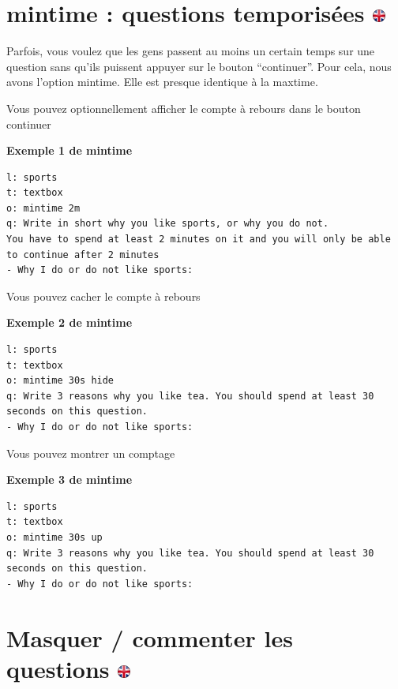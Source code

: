 \documentclass[
]{book}
\begin{document}
\hypertarget{mintime-questions-temporisuxe9es}{%
\section[mintime : questions temporisées ]{\texorpdfstring{mintime : questions temporisées \href{https://www.psytoolkit.org/doc3.4.0/online-survey-syntax.html\#mintime}{\protect\includegraphics{img/ukflag.png}}}{mintime : questions temporisées }}\label{mintime-questions-temporisuxe9es}}

Parfois, vous voulez que les gens passent au moins un certain temps sur une question sans qu'ils puissent appuyer sur le bouton ``continuer''. Pour cela, nous avons l'option mintime. Elle est presque identique à la maxtime.

Vous pouvez optionnellement afficher le compte à rebours dans le bouton continuer

\textbf{Exemple 1 de mintime}

\begin{verbatim}
l: sports
t: textbox
o: mintime 2m
q: Write in short why you like sports, or why you do not.
You have to spend at least 2 minutes on it and you will only be able to continue after 2 minutes
- Why I do or do not like sports:
\end{verbatim}

Vous pouvez cacher le compte à rebours

\textbf{Exemple 2 de mintime}

\begin{verbatim}
l: sports
t: textbox
o: mintime 30s hide
q: Write 3 reasons why you like tea. You should spend at least 30 seconds on this question.
- Why I do or do not like sports:
\end{verbatim}

Vous pouvez montrer un comptage

\textbf{Exemple 3 de mintime}

\begin{verbatim}
l: sports
t: textbox
o: mintime 30s up
q: Write 3 reasons why you like tea. You should spend at least 30 seconds on this question.
- Why I do or do not like sports:
\end{verbatim}

\hypertarget{masquer-commenter-les-questions}{%
\section[Masquer / commenter les questions ]{\texorpdfstring{Masquer / commenter les questions \href{https://www.psytoolkit.org/doc3.4.0/online-survey-syntax.html\#_hiding_commenting_questions_out}{\protect\includegraphics{img/ukflag.png}}}{Masquer / commenter les questions }}\label{masquer-commenter-les-questions}}
\end{document}
